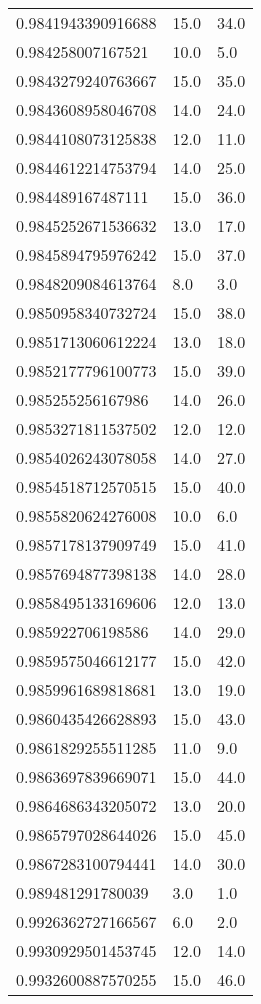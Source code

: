\begin{center}
\begin{supertabular}[H]{p{0.30\textwidth}p{0.05\textwidth}p{0.05\textwidth}}
0.9841943390916688 & 15.0 & 34.0 \\ 
0.984258007167521 & 10.0 & 5.0 \\ 
0.9843279240763667 & 15.0 & 35.0 \\ 
0.9843608958046708 & 14.0 & 24.0 \\ 
0.9844108073125838 & 12.0 & 11.0 \\ 
0.9844612214753794 & 14.0 & 25.0 \\ 
0.984489167487111 & 15.0 & 36.0 \\ 
0.9845252671536632 & 13.0 & 17.0 \\ 
0.9845894795976242 & 15.0 & 37.0 \\ 
0.9848209084613764 & 8.0 & 3.0 \\ 
0.9850958340732724 & 15.0 & 38.0 \\ 
0.9851713060612224 & 13.0 & 18.0 \\ 
0.9852177796100773 & 15.0 & 39.0 \\ 
0.985255256167986 & 14.0 & 26.0 \\ 
0.9853271811537502 & 12.0 & 12.0 \\ 
0.9854026243078058 & 14.0 & 27.0 \\ 
0.9854518712570515 & 15.0 & 40.0 \\ 
0.9855820624276008 & 10.0 & 6.0 \\ 
0.9857178137909749 & 15.0 & 41.0 \\ 
0.9857694877398138 & 14.0 & 28.0 \\ 
0.9858495133169606 & 12.0 & 13.0 \\ 
0.985922706198586 & 14.0 & 29.0 \\ 
0.9859575046612177 & 15.0 & 42.0 \\ 
0.9859961689818681 & 13.0 & 19.0 \\ 
0.9860435426628893 & 15.0 & 43.0 \\ 
0.9861829255511285 & 11.0 & 9.0 \\ 
0.9863697839669071 & 15.0 & 44.0 \\ 
0.9864686343205072 & 13.0 & 20.0 \\ 
0.9865797028644026 & 15.0 & 45.0 \\ 
0.9867283100794441 & 14.0 & 30.0 \\ 
0.989481291780039 & 3.0 & 1.0 \\ 
0.9926362727166567 & 6.0 & 2.0 \\ 
0.9930929501453745 & 12.0 & 14.0 \\ 
0.9932600887570255 & 15.0 & 46.0 \\ 

\end{supertabular}
\end{center}
